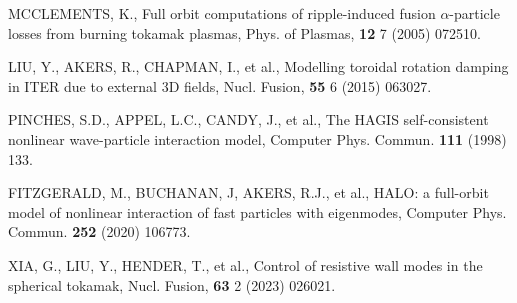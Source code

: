 \documentclass[10pt, a4paper, twoside]{article}
\begin{document}
\begin{thebibliography}{9}
    MCCLEMENTS, K.,
    Full orbit computations of ripple-induced fusion $\alpha$-particle losses from burning tokamak plasmas,
    Phys. of Plasmas,
    \textbf{12} 7
    (2005)
    072510.


    LIU, Y., AKERS, R., CHAPMAN, I., et al.,
    Modelling toroidal rotation damping in ITER due to external 3D fields,
    Nucl. Fusion,
    \textbf{55} 6
    (2015)
    063027.

    PINCHES, S.D., APPEL, L.C., CANDY, J., et al.,
    The HAGIS self-consistent nonlinear wave-particle interaction model,
    Computer Phys. Commun.
    \textbf{111}
    (1998)
    133.

    FITZGERALD, M., BUCHANAN, J, AKERS, R.J., et al.,
    HALO: a full-orbit model of nonlinear interaction of fast particles with eigenmodes,
    Computer Phys. Commun.
    \textbf{252}
    (2020)
    106773.

    XIA, G., LIU, Y., HENDER, T., et al.,
    Control of resistive wall modes in the spherical tokamak,
    Nucl. Fusion,
    \textbf{63} 2
    (2023)
    026021.

\end{thebibliography}
\end{document}

